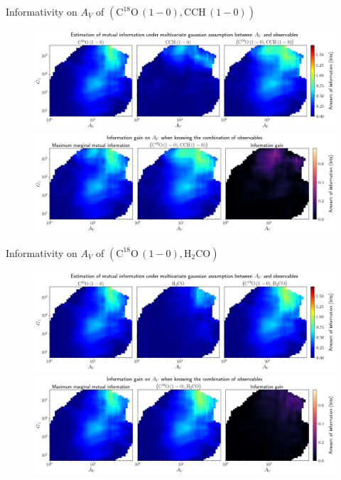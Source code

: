\documentclass{beamer}
\begin{document}
\begin{frame}{Informativity on $A_V$ of $\left(\mathrm{C^{18}O\,(1-0)},\mathrm{CCH\,(1-0)}\right)$}
    \begin{figure}
        \centering
        \includegraphics[width=0.95\linewidth]{../linearinfogauss/av__c18o10_cch10_linearinfogauss.png}
        \vfill
        \includegraphics[width=0.95\linewidth]{../linearinfogauss/av__c18o10_cch10_linearinfogauss_gain.png}
    \end{figure}
\end{frame}

\begin{frame}{Informativity on $A_V$ of $\left(\mathrm{C^{18}O\,(1-0)},\mathrm{H_2CO}\right)$}
    \begin{figure}
        \centering
        \includegraphics[width=0.95\linewidth]{../linearinfogauss/av__c18o10_h2co_linearinfogauss.png}
        \vfill
        \includegraphics[width=0.95\linewidth]{../linearinfogauss/av__c18o10_h2co_linearinfogauss_gain.png}
    \end{figure}
\end{frame}
\end{document}
